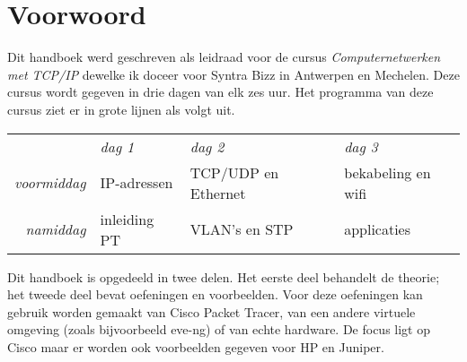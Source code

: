 \chapter{Voorwoord}

Dit handboek werd geschreven als leidraad voor de cursus \emph{Computernetwerken met TCP/IP} dewelke ik doceer voor Syntra Bizz in Antwerpen en Mechelen.
Deze cursus wordt gegeven in drie dagen van elk zes uur.
Het programma van deze cursus ziet er in grote lijnen als volgt uit.

\begin{center}
   \begin{tabular}{rlll}
                       & \textit{dag 1} & \textit{dag 2}      & \textit{dag 3}     \\[1ex]
   \textit{voormiddag} & IP-adressen    & TCP/UDP en Ethernet & bekabeling en wifi \\
   \textit{namiddag}   & inleiding PT   & VLAN's en STP       & applicaties        \\
   \end{tabular}
\end{center}

Dit handboek is opgedeeld in twee delen.
Het eerste deel behandelt de theorie; het tweede deel bevat oefeningen en voorbeelden.
Voor deze oefeningen kan gebruik worden gemaakt van Cisco Packet Tracer, van een andere virtuele omgeving (zoals bijvoorbeeld eve-ng) of van echte hardware.
De focus ligt op Cisco maar er worden ook voorbeelden gegeven voor HP en Juniper.